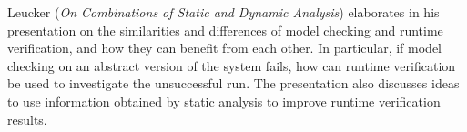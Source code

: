 

Leucker
\cite{isola-2016-leucker}
({\em On Combinations of Static and Dynamic Analysis})
elaborates in his presentation on the similarities and differences of
model checking and runtime verification, and how they can benefit
from each other. In particular, if model checking on an abstract
version of the system fails, how can runtime verification be used to
investigate the unsuccessful run. The presentation also discusses ideas
to use information obtained by static analysis to improve runtime
verification results.
